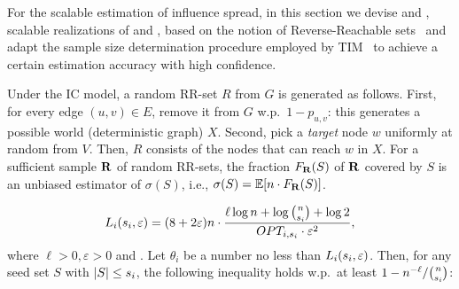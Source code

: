 \enlargethispage{\baselineskip}
For the scalable estimation of influence spread, in this section we devise \fastca and \fastcs, scalable realizations of \CARM and \CSRM, based on the notion of Reverse-Reachable sets~\cite{borgs14} and adapt the sample size determination procedure employed by TIM~\cite{tang14} to achieve a certain estimation accuracy with high confidence.

 Under the IC model, a random RR-set $R$ from $G$ is generated as follows. First, for every edge $(u,v) \in E$, remove it from $G$ w.p.\ $1-p_{u,v}$: this generates a possible world (deterministic graph) $X$. Second, pick a \emph{target} node $w$ uniformly at random from $V$. Then, $R$ consists of the nodes that can reach $w$ in $X$. For a sufficient sample $\mathbf{R}$ of random RR-sets, the fraction $F_{\mathbf{R}}(S)$ of $\mathbf{R}$ covered by $S$ is an unbiased estimator of $\sigma(S)$, i.e., $\sigma(S) = \mathbb{E}[ n \cdot F_{\mathbf{R}}(S)]$.

 
\begin{align}\label{eqn:timLB}
\textcolor{black}{L_{i}(s_i,\varepsilon)} = (8 + 2 \varepsilon) n \cdot \dfrac{\ell \log n + \log \binom{n}{\textcolor{black}{s_i}} + \log 2}{\textcolor{black}{OPT_{i,s_i}} \cdot \varepsilon^{2}},
\end{align}
where $\ell > 0, \varepsilon > 0$ and . Let $\theta_i$ be a number no less than $\textcolor{black}{L_{i}(s_i,\varepsilon)}$. Then, for any seed set $S$ with $\textcolor{black}{|S| \leq s_i}$, the following inequality holds w.p.\ at least $1 - n^{- \ell} / \binom{n}{\textcolor{black}{s_i}}$:


